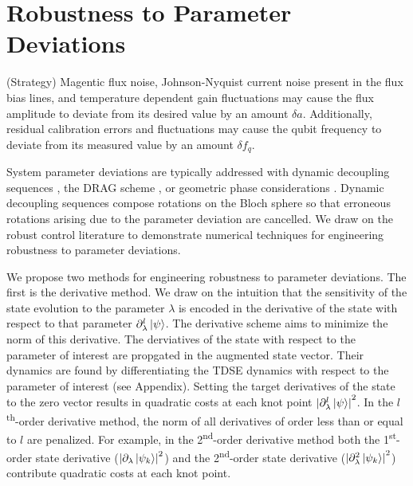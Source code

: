 \documentclass[
  amsfonts,
  amsmath,
  tbtags,
  amssymb,
  aps,
  nobibnotes,
  twocolumn,
  superscriptaddress,
]{revtex4-2}
\begin{document}
\section{Robustness to Parameter Deviations}
(Strategy) Magentic flux noise,
Johnson-Nyquist current noise present in the flux bias
lines, and temperature dependent gain fluctuations
may cause the flux amplitude to deviate from its
desired value by an amount $\delta a$. Additionally,
residual calibration errors and fluctuations may cause
the qubit frequency to deviate from its measured value
by an amount $\delta f_{q}$.

System parameter
deviations are typically addressed with dynamic decoupling
sequences \cite{merrill2014progress},
the DRAG scheme \cite{krantz2019quantum}, or
geometric phase considerations
\cite{xu2020nonadiabatic} \cite{han2020experimental}.
Dynamic decoupling sequences compose rotations on the
Bloch sphere so that erroneous rotations arising due
to the parameter deviation are cancelled.
We draw on the
robust control literature to demonstrate
numerical techniques for engineering robustness
to parameter deviations.

We propose two methods for engineering robustness
to parameter deviations. The first is the
derivative method. We draw on the intuition that
the sensitivity of the state evolution to the parameter
$\lambda$ is encoded in the derivative of
the state with respect to that parameter
$\partial_{\lambda}^{l} \ket{\psi}$. The derivative
scheme aims to minimize the norm of this derivative.
The derviatives of the state with respect to the parameter
of interest are propgated in the
augmented state vector. Their dynamics are found by differentiating
the TDSE dynamics with respect to the parameter of interest
(see Appendix). Setting the target derivatives of the state
to the zero vector results in quadratic costs at each
knot point
${\lvert \partial_{\lambda}^{l} \ket{\psi} \rvert}^{2}$.
In the $l$\textsuperscript{th}-order derivative method, the norm of
all derivatives of order less than or equal to $l$ are penalized. For example,
in the 2\textsuperscript{nd}-order derivative method both the
1\textsuperscript{st}-order state derivative
(${\lvert \partial_{\lambda} \ket{\psi_{k}} \rvert}^{2}$)
and the 2\textsuperscript{nd}-order state derivative
(${\lvert \partial^{2}_{\lambda} \ket{\psi_{k}} \rvert}^{2}$)
contribute quadratic costs at each knot point.
\end{document}
